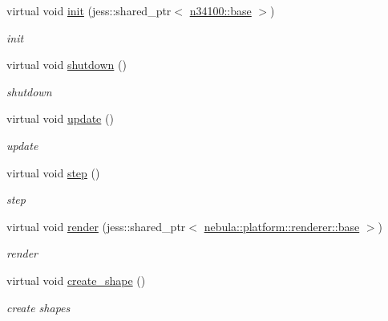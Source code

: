 \begin{DoxyCompactItemize}
\item 
virtual void \hyperlink{classnebula_1_1content_1_1actor_1_1physics_1_1physx_1_1rigid__dynamic_af8da44c366586118db1c6c98cb0e651f}{init} (jess::shared\_\-ptr$<$ \hyperlink{classnebula_1_1content_1_1actor_1_1admin_1_1base}{n34100::base} $>$)
\begin{DoxyCompactList}\small\item\em init \item\end{DoxyCompactList}\item 
virtual void \hyperlink{classnebula_1_1content_1_1actor_1_1physics_1_1physx_1_1rigid__dynamic_a88a75a1eae5e774c51f6b2afd2cb70e6}{shutdown} ()
\begin{DoxyCompactList}\small\item\em shutdown \item\end{DoxyCompactList}\item 
virtual void \hyperlink{classnebula_1_1content_1_1actor_1_1physics_1_1physx_1_1rigid__dynamic_a4687fa4b706a0adf0b733ff199bd0d25}{update} ()
\begin{DoxyCompactList}\small\item\em update \item\end{DoxyCompactList}\item 
virtual void \hyperlink{classnebula_1_1content_1_1actor_1_1physics_1_1physx_1_1rigid__dynamic_a0bd60393cb77edcb4597070dfba9bff4}{step} ()
\begin{DoxyCompactList}\small\item\em step \item\end{DoxyCompactList}\item 
virtual void \hyperlink{classnebula_1_1content_1_1actor_1_1physics_1_1physx_1_1rigid__dynamic_aeb4e0304888f8b4d3fdbebc61eb8a031}{render} (jess::shared\_\-ptr$<$ \hyperlink{classnebula_1_1platform_1_1renderer_1_1base}{nebula::platform::renderer::base} $>$)
\begin{DoxyCompactList}\small\item\em render \item\end{DoxyCompactList}\item 
virtual void \hyperlink{classnebula_1_1content_1_1actor_1_1physics_1_1physx_1_1rigid__dynamic_a0c7836a5a0fb5a6e1bdb50ec4e250d27}{create\_\-shape} ()
\begin{DoxyCompactList}\small\item\em create shapes \item\end{DoxyCompactList}\end{DoxyCompactItemize}
